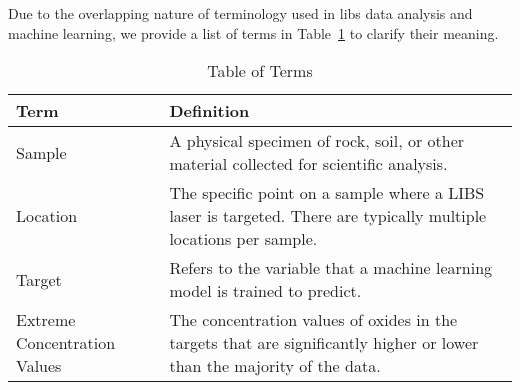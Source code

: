 Due to the overlapping nature of terminology used in \gls{libs} data analysis and machine learning, we provide a list of terms in Table~\ref{tab:terms} to clarify their meaning.

\begin{table}
\centering
\caption{Table of Terms}
\begin{tabularx}{\columnwidth}{lX} %
\toprule
Term & Definition \\
\midrule
Sample & A physical specimen of rock, soil, or other material collected for scientific analysis.\\
Location & The specific point on a sample where a LIBS laser is targeted. There are typically multiple locations per sample. \\
Target & Refers to the variable that a machine learning model is trained to predict. \\
Extreme Concentration Values & The concentration values of oxides in the targets that are significantly higher or lower than the majority of the data. \\
\bottomrule
\end{tabularx}
\label{tab:terms}
\end{table}